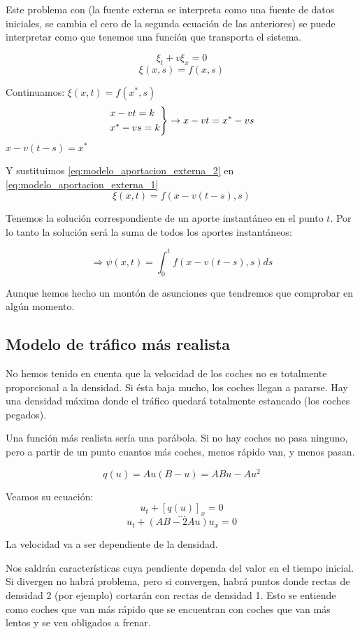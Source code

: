			Este problema con  (la fuente externa se interpreta como una fuente de datos iniciales, se cambia el cero de la segunda ecuación de las anteriores) se puede interpretar como que tenemos una función que transporta el sistema.

			$$\xi_t + v\xi_x = 0$$
			$$\xi(x,s) = f(x,s)$$

			Continuamos:
			\(\xi(x,t) = f(x^*,s) \label{eq:modelo_aportacion_externa_1}\)
			$$
			\begin{rcases}
				x-vt = k \\
				x^* - vs = k
			\end{rcases}
			 \rightarrow x-vt = x^* - vs
			$$
			\( x-v(t-s) = x^{*} \label{eq:modelo_aportacion_externa_2} \)

			Y sustituimos \ref{eq:modelo_aportacion_externa_2} en \ref{eq:modelo_aportacion_externa_1}
			$$\xi(x,t) = f(x - v(t-s), s)$$


			Tenemos la solución correspondiente de un aporte instantáneo en el punto $t$. Por lo tanto la solución será la suma de todos los aportes instantáneos:

			$$\Rightarrow \psi(x,t) = \int^{t}_{0} f(x-v(t-s),s) ds $$

			Aunque hemos hecho un montón de asunciones que tendremos que comprobar en algún momento.

	\subsection{Modelo de tráfico más realista}

		No hemos tenido en cuenta que la velocidad de los coches no es totalmente proporcional a la densidad. Si ésta baja mucho, los coches llegan a pararse. Hay una densidad máxima donde el tráfico quedará totalmente estancado (los coches pegados).

		Una función más realista sería una parábola. Si no hay coches no pasa ninguno, pero a partir de un punto cuantos más coches, menos rápido van, y menos pasan.

		$$ q(u) = Au (B-u) = ABu - Au^{2} $$

		Veamos su ecuación:
		$$u_t + [q(u)]_x = 0$$
		$$ … $$
		$$ u_t + (AB - 2Au) u_x = 0 $$

		La velocidad va a ser dependiente de la densidad.

		Nos saldrán características cuya pendiente dependa del valor en el tiempo inicial. Si divergen no habrá problema, pero si convergen, habrá puntos donde rectas de densidad 2 (por ejemplo) cortarán con rectas de densidad 1. Esto se entiende como coches que van más rápido que se encuentran con coches que van más lentos y se ven obligados a frenar.


